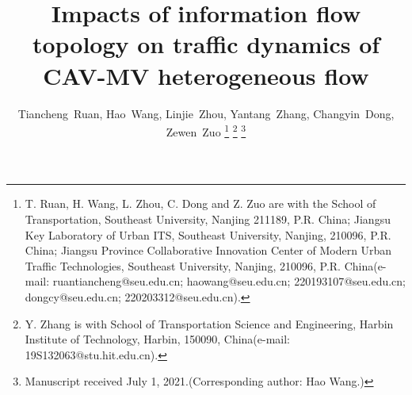 \documentclass[journal]{IEEEtran}
\begin{document}
%
\title{Impacts of information flow topology on traffic dynamics of CAV-MV heterogeneous flow}
%
%
%

\author{Tiancheng~Ruan,
  Hao~Wang,
  Linjie~Zhou,
  Yantang~Zhang,
  Changyin~Dong,
  Zewen~Zuo
  \thanks{T. Ruan,  H. Wang, L. Zhou, C. Dong and Z. Zuo are with the
    School of Transportation, Southeast University, Nanjing 211189, P.R. China;
    Jiangsu Key Laboratory of Urban ITS, Southeast University, Nanjing, 210096, P.R. China;
    Jiangsu Province Collaborative Innovation Center of Modern Urban Traffic Technologies, Southeast University, Nanjing, 210096, P.R. China(e-mail: ruantiancheng@seu.edu.cn;  haowang@seu.edu.cn; 220193107@seu.edu.cn;
    dongcy@seu.edu.cn; 220203312@seu.edu.cn).}%
  \thanks{Y. Zhang is with School of Transportation Science and Engineering, Harbin Institute of Technology, Harbin, 150090,  China(e-mail: 19S132063@stu.hit.edu.cn).}%
  \thanks{Manuscript received July 1, 2021.(Corresponding author: Hao Wang.)}}

% 
%
\end{document}

